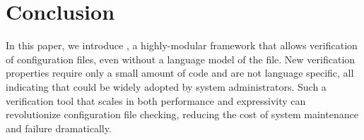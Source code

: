 
\section{Conclusion}

In this paper, we introduce \app, a highly-modular framework 
that allows verification of configuration files, 
even without a language model of the file.
New verification properties require only a small amount of code 
and are not language specific, 
all indicating that \app could be widely adopted by system administrators.
Such a verification tool that scales in both performance and expressivity 
can revolutionize configuration file checking, 
reducing the cost of system maintenance and failure dramatically.
